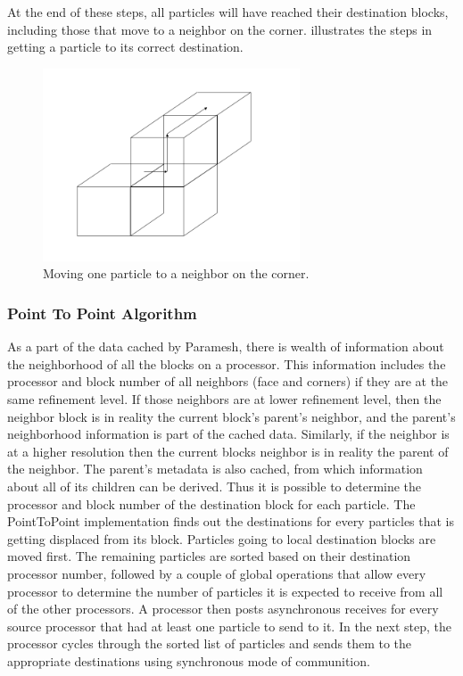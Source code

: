 At the end of these steps, all particles will have reached their
destination blocks, including those that move to a neighbor on the
corner.  illustrates the steps in getting
a particle to its correct destination.
\begin{figure}
\begin{center}
\includegraphics[width=3in]{Grid_ugMoveParticle}
\caption{\label{Fig:ugMoveParticle}
        Moving one particle to a neighbor on the corner.}
\end{center}
\end{figure}

\subsubsection {Point To Point Algorithm}
\label {Sec: ptop_algorithm}

As a part of the data cached by Paramesh, there is wealth of
information about the neighborhood of all the blocks on a
processor. This information includes the processor and block number of
all neighbors (face and corners) if they are at the same refinement
level. If those neighbors are at lower refinement level, then the
neighbor block is in reality the current block's parent's neighbor,
and the parent's neighborhood information is part of the cached
data. Similarly, if the neighbor is at a higher resolution then the
current blocks neighbor is in reality the parent of the neighbor. The
parent's metadata is also cached, from which information about all of
its children can be derived. Thus it is possible to determine the
processor and block number of the destination block for each particle.
The PointToPoint implementation finds out the destinations for every
particles that is getting displaced from its block. Particles going to
local destination blocks are moved first. The remaining particles are
sorted based on their destination processor number, followed by a
couple of global operations that allow every processor to determine
the number of particles it is expected to receive from all of the
other processors. A processor then posts asynchronous receives for
every source processor that had at least one particle to send to
it. In the next step, the processor cycles through the sorted list of
particles and sends them to the appropriate destinations using
synchronous mode of communition. 

